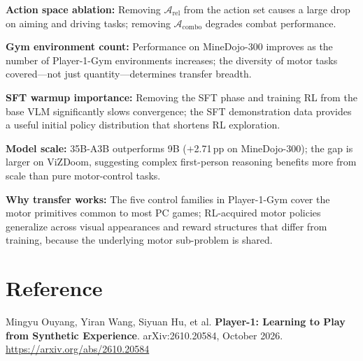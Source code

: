 \documentclass[10pt,twocolumn]{article}
\begin{document}
\textbf{Action space ablation:} Removing $\mathcal{A}_{\mathrm{rel}}$ from the
action set causes a large drop on aiming and driving tasks; removing
$\mathcal{A}_{\mathrm{combo}}$ degrades combat performance.

\textbf{Gym environment count:} Performance on MineDojo-300 improves as the
number of Player-1-Gym environments increases; the diversity of motor tasks
covered---not just quantity---determines transfer breadth.

\textbf{SFT warmup importance:} Removing the SFT phase and training RL from the
base VLM significantly slows convergence; the SFT demonstration data provides a
useful initial policy distribution that shortens RL exploration.

\textbf{Model scale:} 35B-A3B outperforms 9B ($+$2.71\,pp on MineDojo-300);
the gap is larger on ViZDoom, suggesting complex first-person reasoning benefits
more from scale than pure motor-control tasks.

\textbf{Why transfer works:} The five control families in Player-1-Gym cover
the motor primitives common to most PC games; RL-acquired motor policies
generalize across visual appearances and reward structures that differ from
training, because the underlying motor sub-problem is shared.

\section*{Reference}

Mingyu Ouyang, Yiran Wang, Siyuan Hu, et al.
\textbf{Player-1: Learning to Play from Synthetic Experience}.
arXiv:2610.20584, October 2026.\\
\url{https://arxiv.org/abs/2610.20584}
\end{document}
